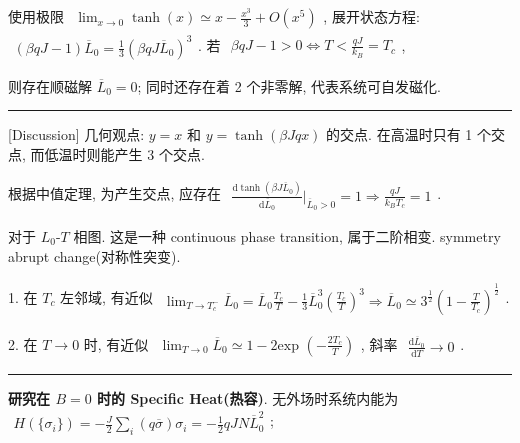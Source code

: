\documentclass[../../main.tex]{subfiles}
\begin{document}
使用极限 $\begin{aligned}
    \lim_{x\rightarrow 0}\tanh{(x)} \simeq x - \frac{x^{3}}{3} + O(x^{5})
\end{aligned}$, 展开状态方程: $\begin{aligned}
    (\beta qJ-1)\overline{L}_{0} = \frac{1}{3}\left(\beta qJ\overline{L}_{0}\right)^{3}
\end{aligned}$. 若 $\begin{aligned}
    \beta qJ-1 > 0\Leftrightarrow T < \frac{qJ}{k_{B}} = T_{c}
\end{aligned}$, 

则存在顺磁解 $\overline{L}_{0} = 0$; 同时还存在着 2 个非零解, 代表系统可自发磁化. 

\vspace{0.5em}\hrule\vspace{0.5em}
[Discussion] 几何观点: $y = x$ 和 $y = \tanh(\beta Jqx)$ 的交点. 
在高温时只有 1 个交点, 而低温时则能产生 3 个交点. 

根据中值定理, 为产生交点, 应存在 $\begin{aligned}
    \frac{\mathrm{d}\tanh{\left(\beta J\overline{L}_{0}\right)}}{\mathrm{d}\overline{L}_{0}}\bigg|_{\overline{L}_{0}>0} = 1\Rightarrow \frac{qJ}{k_{B}T_{c}} = 1
\end{aligned}$. 

对于 $L_{0}$-$T$ 相图. 这是一种 continuous phase transition, 属于二阶相变. symmetry abrupt change(对称性突变).

1. 在 $T_{c}$ 左邻域, 有近似 $\begin{aligned}
    \lim_{T\rightarrow T_{c}^{-}}\overline{L}_{0} = \overline{L}_{0}\frac{T_{c}}{T} - \frac{1}{3}\overline{L}_{0}^{3}\left(\frac{T_{c}}{T}\right)^{3}\Rightarrow \overline{L}_{0} \simeq 3^{\frac{1}{2}}\left(1 - \frac{T}{T_{c}}\right)^{\frac{1}{2}}
\end{aligned}$. 

2. 在 $T\rightarrow 0$ 时, 有近似 $\begin{aligned}
    \lim_{T\rightarrow 0}\overline{L}_{0}\simeq 1 - 2\text{exp }\left(-\frac{2T_{c}}{T}\right)
\end{aligned}$, 斜率 $\begin{aligned}
    \frac{\mathrm{d}\overline{L}_{0}}{\mathrm{d}T} \rightarrow 0
\end{aligned}$. 
\vspace{0.5em}\hrule\vspace{0.5em}

\textbf{研究在 $B=0$ 时的 Specific Heat(热容)}. 无外场时系统内能为 $\begin{aligned}
    H(\{\sigma_{i}\}) = -\frac{J}{2}\sum_{i}(q\overline{\sigma})\sigma_{i} = -\frac{1}{2}qJN\overline{L}_{0}^{2}
\end{aligned}$; 
\end{document}
